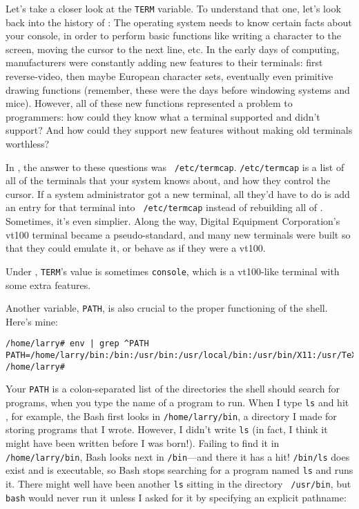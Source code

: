 Let's take a closer look at the {\tt TERM} variable.
To understand that one, let's look back into the history of \unix: The
operating system needs to know certain facts about your console, in
order to perform basic functions like writing a character to the
screen, moving the cursor to the next line, etc.  In the early days of
computing, manufacturers were constantly adding new features to their
terminals: first reverse-video, then maybe European character sets,
eventually even primitive drawing functions (remember, these were the
days before windowing systems and mice).  However, all of these new
functions represented a problem to programmers: how could they know
what a terminal supported and didn't support? And how could they
support new features without making old terminals worthless?

In \unix, the answer to these questions was {\tt
  /etc/termcap}. {\tt /etc/termcap} is a list of
all of the terminals that your system knows about, and how they
control the cursor. If a system administrator got a new terminal, all
they'd have to do is add an entry for that terminal into {\tt
  /etc/termcap} instead of rebuilding all of \unix. Sometimes, it's
even simplier. Along the way, Digital Equipment
Corporation's vt100
terminal became a pseudo-standard, and many new terminals were built
so that they could emulate it, or behave as if they were a vt100.

Under \linux, {\tt TERM}'s value is sometimes {\tt console}, which is
a vt100-like terminal with some extra features.

Another variable, {\tt PATH}, is also crucial to the proper functioning of
the shell.  Here's mine:

\begin{screen}\begin{verbatim}
/home/larry# env | grep ^PATH
PATH=/home/larry/bin:/bin:/usr/bin:/usr/local/bin:/usr/bin/X11:/usr/TeX/bin
/home/larry#
\end{verbatim}\end{screen}

Your {\tt PATH} is a colon-separated list of the directories the shell
should search for programs, when you type the name of a program to
run.  When I type {\tt ls} and hit , for example, the Bash
first looks in {\tt /home/larry/bin}, a directory I made for storing
programs that I wrote.  However, I didn't write {\tt ls} (in fact, I
think it might have been written before I was born!).  Failing to find
it in {\tt /home/larry/bin}, Bash looks next in {\tt /bin}---and there
it has a hit!  {\tt /bin/ls} does exist and is executable, so Bash
stops searching for a program named {\tt ls} and runs it.  There might
well have been another {\tt ls} sitting in the directory {\tt
  /usr/bin}, but {\tt bash} would never run it unless I asked for it by
specifying an explicit pathname:

